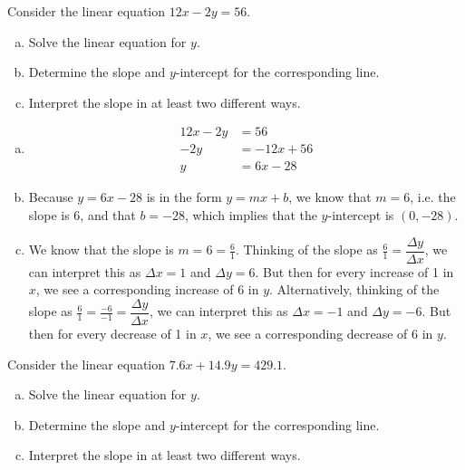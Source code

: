 \documentclass[11pt,letterpaper]{article}
\begin{document}
 Consider the linear equation $12x - 2y= 56$. 
\begin{enumerate}[(a)]
\item Solve the linear equation for $y$. 
\item Determine the slope and $y$-intercept for the corresponding line.
\item Interpret the slope in at least two different ways. 
\end{enumerate} \pspace

\sol
\begin{enumerate}[(a)]
\item 
	\[
	\begin{aligned}
	12x - 2y&= 56 \\[0.3cm]
	-2y&= -12x + 56 \\[0.3cm]
	y&= 6x - 28
	\end{aligned}
	\] \pspace

\item Because $y= 6x - 28$ is in the form $y= mx + b$, we know that $m= 6$, i.e. the slope is 6, and that $b= -28$, which implies that the $y$-intercept is $(0, -28)$. \pspace

\item We know that the slope is $m= 6= \frac{6}{1}$. Thinking of the slope as $\frac{6}{1}= \dfrac{\Delta y}{\Delta x}$, we can interpret this as $\Delta x= 1$ and $\Delta y= 6$. But then for every increase of 1 in $x$, we see a corresponding increase of 6 in $y$. Alternatively, thinking of the slope as $\frac{6}{1}= \frac{-6}{-1}= \dfrac{\Delta y}{\Delta x}$, we can interpret this as $\Delta x= -1$ and $\Delta y= -6$. But then for every decrease of 1 in $x$, we see a corresponding decrease of 6 in $y$.
\end{enumerate}



\newpage



 Consider the linear equation $7.6x + 14.9y= 429.1$. 
\begin{enumerate}[(a)]
\item Solve the linear equation for $y$. 
\item Determine the slope and $y$-intercept for the corresponding line.
\item Interpret the slope in at least two different ways. 
\end{enumerate} \pspace
\end{document}
